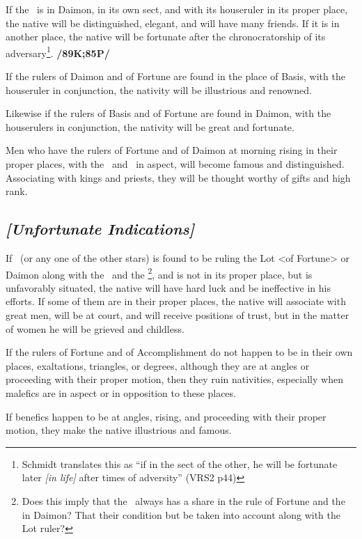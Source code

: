 If the \Sun\, is in Daimon, in its own sect, and with its houseruler in its proper place, the native will be distinguished, elegant, and will have many friends. If it is in another place, the native will be fortunate after the chronocratorship of its adversary\footnote{Schmidt translates this as ``if in the sect of the other, he will be fortunate later \textsl{[in life]} after times of adversity'' (VRS2 p44)}. \textbf{/89K;85P/}

If the rulers of Daimon and of Fortune are found in the place of Basis, with the houseruler in conjunction, the nativity will be illustrious and renowned. 

Likewise if the rulers of Basis and of Fortune are found in Daimon, with the houserulers in conjunction, the nativity will be great and fortunate. 

Men who have the rulers of Fortune and of Daimon at morning rising in their proper places, with the \Sun\, and \Moon\, in aspect, will become famous and distinguished. Associating with kings and priests, they will be thought worthy of gifts and high rank. 

\subsection{\textit{[Unfortunate Indications]}}
If \Venus\, (or any one of the other stars) is found to be ruling the Lot <of Fortune> or Daimon along with the \Sun\, and the \Moon\footnote{Does this imply that the \Moon\, always has a share in the rule of Fortune and the \Sun\, in Daimon? That their condition but be taken into account along with the Lot ruler?}, and is not in its proper place, but is unfavorably situated, the native will have hard luck and be ineffective in his efforts. If some of them are in their proper places, the native will associate with great men, will be at court, and will receive positions of trust, but in the matter of women he will be grieved and childless.

If the rulers of Fortune and of Accomplishment  do not happen to be in their own places, exaltations, triangles, or degrees, although they are at angles or proceeding with their proper motion, then they ruin nativities, especially when malefics are in aspect or in opposition to these places. 

If benefics happen to be at angles, rising, and proceeding with their proper motion, they make the native illustrious and famous. 

